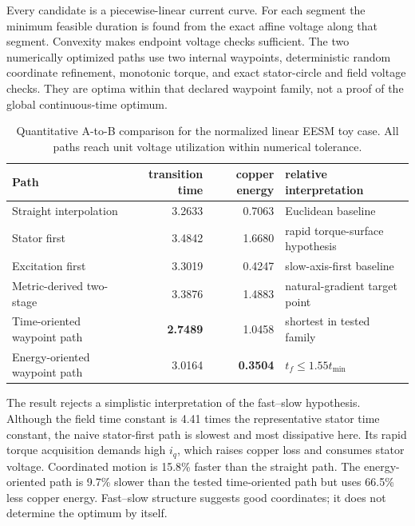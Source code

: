 Every candidate is a piecewise-linear current curve.  For each segment the
minimum feasible duration is found from the exact affine voltage along that
segment.  Convexity makes endpoint voltage checks sufficient.  The two
numerically optimized paths use two internal waypoints, deterministic random
coordinate refinement, monotonic torque, and exact stator-circle and field
voltage checks.  They are optima within that declared waypoint family, not a
proof of the global continuous-time optimum.

\begin{table}[tb]
\centering
\caption{Quantitative A-to-B comparison for the normalized linear EESM toy
case.  All paths reach unit voltage utilization within numerical tolerance.}
\label{tab:dynamic-results}
\small
\begin{tabularx}{\linewidth}{@{}lrrX@{}}
\toprule
Path & transition time & copper energy & relative interpretation\\
\midrule
Straight interpolation & 3.2633 & 0.7063 & Euclidean baseline\\
Stator first & 3.4842 & 1.6680 & rapid torque-surface hypothesis\\
Excitation first & 3.3019 & 0.4247 & slow-axis-first baseline\\
Metric-derived two-stage & 3.3876 & 1.4883 & natural-gradient target point\\
Time-oriented waypoint path & \textbf{2.7489} & 1.0458 & shortest in tested family\\
Energy-oriented waypoint path & 3.0164 & \textbf{0.3504} & \(t_f\leq1.55t_{\min}\)\\
\bottomrule
\end{tabularx}
\end{table}

The result rejects a simplistic interpretation of the fast--slow hypothesis.
Although the field time constant is 4.41 times the representative stator time
constant, the naive stator-first path is slowest and most dissipative here.
Its rapid torque acquisition demands high \(i_q\), which raises copper loss
and consumes stator voltage.  Coordinated motion is 15.8\% faster than the
straight path.  The energy-oriented path is 9.7\% slower than the tested
time-oriented path but uses 66.5\% less copper energy.  Fast--slow structure
suggests good coordinates; it does not determine the optimum by itself.




